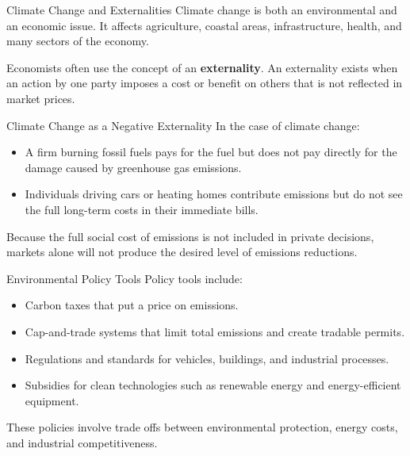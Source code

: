 \documentclass[aspectratio=169]{beamer}
\begin{document}
\begin{frame}{Climate Change and Externalities}
  \transfade
  Climate change is both an environmental and an economic issue. It affects agriculture,
  coastal areas, infrastructure, health, and many sectors of the economy.

  \vspace{0.2cm}
  Economists often use the concept of an \textbf{externality}. An externality exists when an action
  by one party imposes a cost or benefit on others that is not reflected in market prices.
\end{frame}

\begin{frame}{Climate Change as a Negative Externality}
  \transfade
  In the case of climate change:

  \begin{itemize}[<+->]
    \item A firm burning fossil fuels pays for the fuel but does not pay directly for the damage
    caused by greenhouse gas emissions.
    \item Individuals driving cars or heating homes contribute emissions but do not see the full
    long-term costs in their immediate bills.
  \end{itemize}

  \vspace{0.3cm}
  Because the full social cost of emissions is not included in private decisions, markets alone
  will not produce the desired level of emissions reductions.
\end{frame}

\begin{frame}{Environmental Policy Tools}
  \transfade
  Policy tools include:
  \begin{itemize}[<+->]
    \item Carbon taxes that put a price on emissions.
    \item Cap-and-trade systems that limit total emissions and create tradable permits.
    \item Regulations and standards for vehicles, buildings, and industrial processes.
    \item Subsidies for clean technologies such as renewable energy and energy-efficient equipment.
  \end{itemize}

  \vspace{0.3cm}
  These policies involve trade offs between environmental protection, energy costs, and
  industrial competitiveness.
\end{frame}
\end{document}
